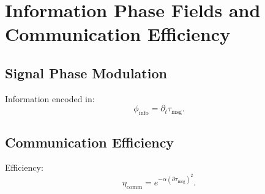 \chapter{Information Phase Fields and Communication Efficiency}

\section{Signal Phase Modulation}
Information encoded in:
\[
\phi_{\mathrm{info}} = \partial_t \tau_{\mathrm{msg}}.
\]

\section{Communication Efficiency}
Efficiency:
\[
\eta_{\mathrm{comm}} = e^{-\alpha (\partial\tau_{\mathrm{msg}})^2}.
\]

